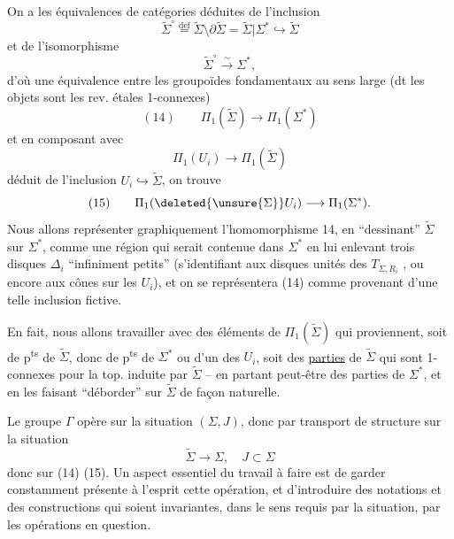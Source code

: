 On a les équivalences de catégories
déduites de l'inclusion
\[
\widetilde\Sigma^\circ \overset{\mathrm{def}}= \widetilde\Sigma\setminus\partial\widetilde\Sigma = \widetilde\Sigma|\Sigma^* \hookrightarrow \widetilde\Sigma
\]
et de l'isomorphisme
\[
\widetilde\Sigma^\circ \xrightarrow{\sim} \Sigma^*,
\]
d'où une équivalence entre les groupoïdes fondamentaux au sens large (dt les objets sont les rev. étales 1-connexes)
\[
(14)\qquad \Pi_1(\widetilde\Sigma) \longrightarrow \Pi_1(\Sigma^*)
\]
et en composant avec
\[
\Pi_1(U_i)\longrightarrow \Pi_1(\widetilde\Sigma)
\]
déduit de l'inclusion $U_i\hookrightarrow\widetilde\Sigma$, on trouve
\[
(15)\qquad \Pi_1(\deleted{\unsure{\Sigma}}U_i)\longrightarrow\Pi_1(\Sigma^*).
\]
Nous allons représenter graphiquement l'homomorphisme 14, en ``dessinant'' $\widetilde\Sigma$ sur $\Sigma^*$, comme une région qui serait contenue dans $\Sigma^*$ en lui enlevant  trois disques  $\Delta_i$ ``infiniment petits''  (s'identifiant aux disques unités des $T_{\Sigma,R_i}$ , ou encore aux cônes sur les $U_i$), et on se représentera (14) comme provenant d'une telle inclusion fictive.

En fait, nous allons travailler avec des éléments de $\Pi_1(\widetilde\Sigma)$ qui proviennent, soit de p\textsuperscript{ts} de $\widetilde\Sigma$, donc de p\textsuperscript{ts} de $\Sigma^*$ ou d'un des $U_i$, soit des \uline{parties} de $\widetilde\Sigma$ qui sont 1-connexes pour la top. induite par $\widetilde\Sigma$ -- en partant peut-être des parties  de $\Sigma^*$, et en les faisant ``déborder'' sur $\widetilde\Sigma$ de façon naturelle.

Le groupe $\Gamma$ opère sur la situation  $(\Sigma,J)$, donc par transport de structure sur la situation
\[
\widetilde\Sigma\longrightarrow\Sigma,\quad J\subset\Sigma
\]
donc sur  (14) (15). Un aspect essentiel du travail à faire est de garder  constamment présente à l'esprit cette opération, et d'introduire des notations et des constructions qui soient invariantes, dans le sens requis par la situation, par les opérations en question.

